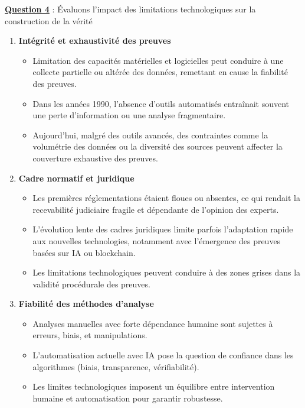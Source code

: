 \documentclass[12pt, a4paper]{article}
\newcommand{\question}[1]{\textbf{\underline{Question #1}}}
\begin{document}
\begin{enumerate}[label=\textbf{\arabic*.}, start=6]
		\question{4} : Évaluons l'impact des limitations technologiques sur la construction de la vérité
		
		\begin{enumerate}
			\item \textbf{Intégrité et exhaustivité des preuves}
			\begin{itemize}
				\item Limitation des capacités matérielles et logicielles peut conduire à une collecte partielle ou altérée des données, remettant en cause la fiabilité des preuves.
				\item Dans les années 1990, l'absence d'outils automatisés entraînait souvent une perte d'information ou une analyse fragmentaire.
				\item Aujourd'hui, malgré des outils avancés, des contraintes comme la volumétrie des données ou la diversité des sources peuvent affecter la couverture exhaustive des preuves.
			\end{itemize}
			
			\item \textbf{Cadre normatif et juridique}
			\begin{itemize}
				\item Les premières réglementations étaient floues ou absentes, ce qui rendait la recevabilité judiciaire fragile et dépendante de l'opinion des experts.
				\item L'évolution lente des cadres juridiques limite parfois l'adaptation rapide aux nouvelles technologies, notamment avec l'émergence des preuves basées sur IA ou blockchain.
				\item Les limitations technologiques peuvent conduire à des zones grises dans la validité procédurale des preuves.
			\end{itemize}
			
			\item \textbf{Fiabilité des méthodes d'analyse}
			\begin{itemize}
				\item Analyses manuelles avec forte dépendance humaine sont sujettes à erreurs, biais, et manipulations.
				\item L'automatisation actuelle avec IA pose la question de confiance dans les algorithmes (biais, transparence, vérifiabilité).
				\item Les limites technologiques imposent un équilibre entre intervention humaine et automatisation pour garantir robustesse.
			\end{itemize}
			

\end{enumerate}
\end{enumerate}
\end{document}
